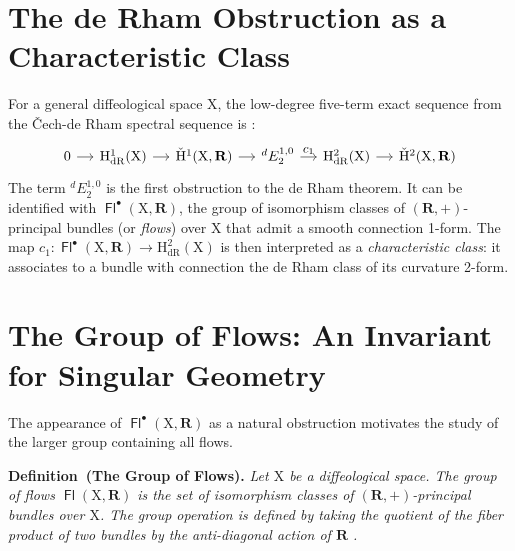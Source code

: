 \documentclass[10pt,letterpaper,reqno]{amsart}
\newenvironment{definition}[1]%
{\noindent\textbf{Definition#1.} \it}%
{}
\newcommand{\RR}{\mathbf{R}}
\newcommand{\X}{\mathrm{X}}
\DeclareMathOperator{\Fb}{\boldsymbol{\mathsf{Fl}}}
\newcommand{\Hdr}{\mathrm{H}_{\mathrm{dR}}}
\newcommand{\vH}{\check{\mathrm{H}}}
\begin{document}
  
  \section{The de Rham Obstruction as a Characteristic Class}
  
  For a general diffeological space $\X$, the low-degree five-term exact sequence from the Čech-de Rham spectral sequence is \cite{PIZ24}:
  $$
    \begin{tikzcd}[column sep=1.2em, every label/.append style = {font = \small}]
    0 \arrow[r] & \Hdr^1(\X) \arrow[r] & \vH^1(\X,\RR) \arrow[r] & {}^dE_2^{1,0} \arrow[r, "c_1"] & \Hdr^2(\X) \arrow[r] & \vH^2(\X,\RR)
    \end{tikzcd}
    $$
  The term ${}^dE_2^{1,0}$ is the first obstruction to the de Rham theorem. It can be identified with $\Fb^\bullet(\X, \RR)$, the group of isomorphism classes of $(\RR,+)$-principal bundles (or \emph{flows}) over $\X$ that admit a smooth connection 1-form. The map $c_1: \Fb^\bullet(\X, \RR) \to \Hdr^2(\X)$ is then interpreted as a \emph{characteristic class}: it associates to a bundle with connection the de Rham class of its curvature 2-form.
  
  
  \section{The Group of Flows: An Invariant for Singular Geometry}
  
  The appearance of $\Fb^\bullet(\X, \RR)$ as a natural obstruction motivates the study of the larger group containing all flows.
  
  \begin{definition}{~(The Group of Flows)}
    Let $\X$ be a diffeological space. The \emph{group of flows} $\Fb(\X, \RR)$ is the set of isomorphism classes of $(\RR,+)$-principal bundles over $\X$. The group operation is defined by taking the quotient of the fiber product of two bundles by the anti-diagonal action of $\RR$ \cite{PIZ25a}.
  \end{definition}
  
\end{document}
